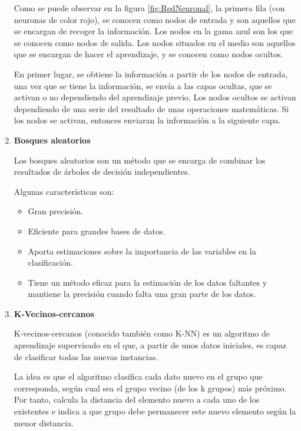 \begin{enumerate}
	Como se puede observar en la figura \ref{fig:RedNeuronal}, la primera fila (con neuronas de color rojo), se conocen como nodos de entrada y son aquellos que se encargan de recoger la información. Los nodos en la gama azul son los que se conocen como nodos de salida. Los nodos situados en el medio son aquellos que se encargan de hacer el aprendizaje, y se conocen como nodos ocultos.
	
	En primer lugar, se obtiene la información a partir de los nodos de entrada, una vez que se tiene la información, se envía a las capas ocultas, que se activan o no dependiendo del aprendizaje previo. Los nodos ocultos se activan dependiendo de una serie del resultado de unas operaciones matemáticas. Si los nodos se activan, entonces enviaran la información a la siguiente capa.
	
	\item \textbf{Bosques aleatorios}
	
	Los bosques aleatorios son un método que se encarga de combinar los resultados de árboles de decisión independientes.
	
	Algunas características son:
	\begin{itemize}
		\item Gran precisión.
		\item Eficiente para grandes bases de datos.
		\item Aporta estimaciones sobre la importancia de las variables en la clasificación.
		\item Tiene un método eficaz para la estimación de los datos faltantes y mantiene la precisión cuando falta una gran parte de los datos.
	\end{itemize}
	
	\item \textbf{K-Vecinos-cercanos}
	
	K-vecinos-cercanos (conocido también como K-NN) es un algoritmo de aprendizaje supervisado en el que, a partir de unos datos iniciales, es capaz de clasificar todas las nuevas instancias.
	
	La idea es que el algoritmo clasifica cada dato nuevo en el grupo que corresponda, según cual sea el grupo vecino (de los k grupos) más próximo. Por tanto, calcula la distancia del elemento nuevo a cada uno de los existentes e indica a que grupo debe permanecer este nuevo elemento según la menor distancia.
	

\end{enumerate}
